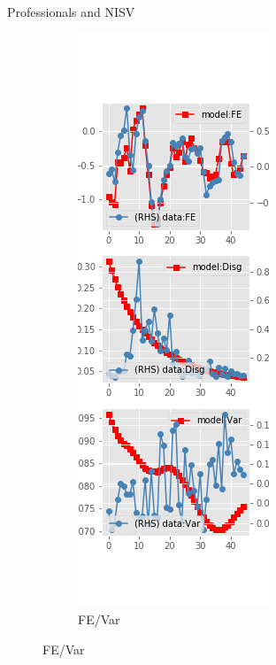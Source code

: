 \documentclass{beamer}
\begin{document}
\begin{frame}{Professionals and NISV}
	\begin{figure}[ht]
		\label{NISV_diag_SPF}
		\begin{subfigure}[b]{0.2\textwidth}
			\centering
			\caption{FE/Var}
			\includegraphics[width=\textwidth, height = 0.8\textheight]{figuresDraft/spf_ni_est_sv_diag0.png}

\end{subfigure}
\end{figure}
\end{frame}
\end{document}

